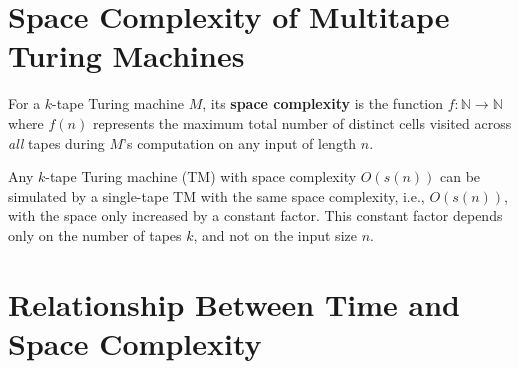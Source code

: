 \section{Space Complexity of Multitape Turing Machines}

\begin{definition}
For a $k$-tape Turing machine $M$, its \textbf{space complexity} is the function $f: \mathbb{N} \rightarrow \mathbb{N}$ where $f(n)$ represents the 
maximum total number of distinct cells visited across \emph{all} tapes during $M$'s computation on any input of length $n$. 
\end{definition}

\begin{theorem}
    Any $k$-tape Turing machine (TM) with space complexity $O(s(n))$ can be simulated by a single-tape TM with the same space complexity, 
    i.e., $O(s(n))$, with the space only increased by a constant factor. 
    This constant factor depends only on the number of tapes $k$, and not on the input size $n$.
\end{theorem}

    
\section{Relationship Between Time and Space Complexity}

